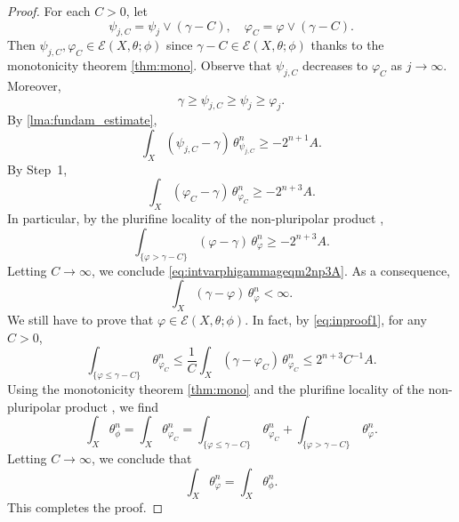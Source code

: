 \begin{proof}
	For each $C>0$, let
	\[
	\psi_{j,C}=\psi_j \lor (\gamma-C),\quad \varphi_C=\varphi \lor (\gamma-C).
	\]
    Then $\psi_{j,C},\varphi_C\in \mathcal{E}(X,\theta;\phi)$ since $\gamma-C\in \mathcal{E}(X,\theta;\phi)$ thanks to the monotonicity theorem \cref{thm:mono}.
	Observe that $\psi_{j,C}$ decreases to $\varphi_C$ as $j\to \infty$. Moreover,
    \[
    \gamma\geq \psi_{j,C} \geq \psi_j\geq \varphi_j.
    \]
	By \cref{lma:fundam_estimate},
	\[
	\int_X (\psi_{j,C}-\gamma)\,\theta_{\psi_{j,C}}^n\geq -2^{n+1}A.
	\]
	By Step~1,
	\begin{equation}\label{eq:inproof1}
		\int_X(\varphi_C-\gamma)\,\theta_{\varphi_C}^n\geq -2^{n+3}A.
	\end{equation}
	In particular, by the plurifine locality of the non-pluripolar product ,
	\[
	    \int_{\{\varphi>\gamma-C\}}(\varphi-\gamma)\,\theta_{\varphi}^n\geq -2^{n+3}A.
	\]
	Letting $C\to \infty$, we conclude \eqref{eq:intvarphigammageqm2np3A}. As a consequence,
    \[
        \int_X (\gamma-\varphi)\,\theta_{\varphi}^n<\infty.
    \]
	We still have to prove that $\varphi\in \mathcal{E}(X,\theta;\phi)$. In fact, by \eqref{eq:inproof1}, for any $C>0$,
	\[
	\int_{\{\varphi\leq \gamma-C\}}\,\theta_{\varphi_C}^n\leq \frac{1}{C}\int_X (\gamma-\varphi_C)\,\theta_{\varphi_C}^n\leq 2^{n+3}C^{-1}A.
	\]
	Using the monotonicity theorem \cref{thm:mono} and the plurifine locality of the non-pluripolar product , we find
    \[
    \int_X \theta_{\phi}^n=\int_X \theta_{\varphi_C}^n=\int_{\{\varphi\leq \gamma-C\}}\,\theta_{\varphi_C}^n+\int_{\{\varphi>\gamma-C\}}\,\theta_{\varphi}^n.
    \]
    Letting $C\to\infty$, we conclude that
    \[
    \int_X \theta_{\varphi}^n=\int_X \theta_{\phi}^n.
    \]
    This completes the proof.
\end{proof}

